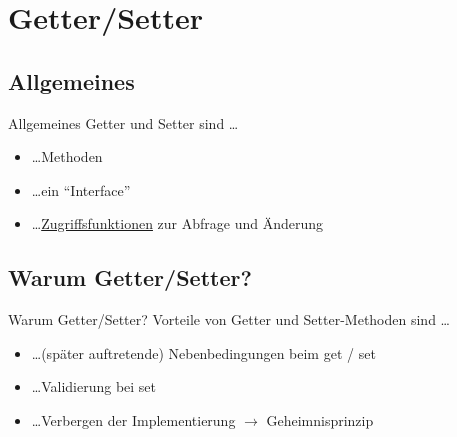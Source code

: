 \documentclass[usepdftitle=false,hyperref={pdfpagelabels=false}]{beamer}
\begin{document}
\section{Getter/Setter}
\subsection{Allgemeines}
\begin{frame}{Allgemeines}
    Getter und Setter sind \dots
    \begin{itemize}[<+->]
        \item \dots Methoden
        \item \dots ein "`Interface"'
        \item \dots \href{http://de.wikipedia.org/wiki/Zugriffsfunktion}{Zugriffsfunktionen} zur Abfrage und Änderung
    \end{itemize}
\end{frame}

\subsection{Warum Getter/Setter?}
\begin{frame}{Warum Getter/Setter?}
    Vorteile von Getter und Setter-Methoden sind \dots
    \begin{itemize}[<+->]
        \item \dots (später auftretende) Nebenbedingungen beim get / set
        \item \dots Validierung bei set
        \item \dots Verbergen der Implementierung $\rightarrow$ Geheimnisprinzip
    \end{itemize}
\end{frame}
\end{document}

